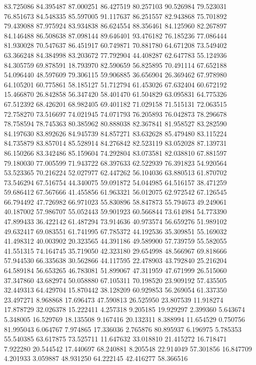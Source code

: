 83.725086
84.395487
87.000251
86.427519
80.257103
90.526984
79.523031
76.851673
84.548335
85.597005
91.117637
86.251557
82.943868
75.701892
79.439088
87.975924
83.934838
86.624554
88.356461
84.125960
82.267897
84.146488
86.508638
87.098144
89.646401
93.476182
76.185236
77.086444
81.930028
70.547637
86.451917
60.749871
70.881780
64.671208
73.549402
63.366248
84.384998
83.203672
77.792904
44.408287
62.647783
55.124936
84.305759
69.878591
18.793970
82.590659
56.825895
70.491114
67.652188
54.096440
48.597609
79.306115
59.906885
36.656904
26.369462
67.978980
64.105201
60.775861
58.185127
51.712794
61.453026
67.632404
60.672192
15.466870
26.842858
56.347420
58.401470
61.504829
63.095831
64.775326
67.512392
68.426201
68.982405
69.401182
71.029158
71.515131
72.063515
72.758270
73.516697
74.021945
74.071793
76.205893
76.042873
78.296678
78.758594
78.745363
80.385962
80.888038
82.367841
81.958527
83.282590
84.197630
83.892626
84.945739
84.857271
83.632628
85.479480
83.115224
84.735879
83.857014
85.528914
84.276842
82.523119
83.052028
87.139731
86.150266
83.342486
85.159604
74.292804
83.073581
82.038810
67.881597
79.180030
77.005599
71.943722
68.397633
62.522939
76.391823
54.920564
53.523365
70.216224
52.027977
62.447262
56.104036
63.880513
61.870702
73.546294
67.516754
44.340075
59.091872
54.044985
64.516157
38.471259
59.686412
67.567666
41.455856
61.963321
56.012075
62.972542
67.126545
66.794492
47.726982
66.971023
55.830896
58.847873
55.794673
49.249061
40.187002
57.986707
55.052443
59.901923
60.566844
73.614984
54.773390
47.899433
36.422142
61.487294
73.914636
40.973574
56.659276
51.989102
49.632417
69.083551
61.741995
67.785372
44.192536
35.309851
55.169032
41.498312
40.003902
20.323565
44.391186
49.589900
57.739759
55.582055
41.551315
74.164745
35.719050
42.323180
29.654998
48.566967
69.818666
57.944530
66.335638
30.562866
44.117595
22.478903
43.792840
25.216204
64.589184
56.653265
46.783081
51.899067
47.311959
47.671999
26.515060
37.347860
43.682974
50.058880
67.105311
70.198520
23.909192
57.435505
32.449313
64.429704
15.870442
38.128209
60.929853
56.269054
61.337350
23.497271
8.968868
17.696473
47.590813
26.525950
23.807539
11.918274
17.878729
32.026378
15.222411
4.257318
9.205185
19.929297
2.399360
5.643674
5.348005
16.529769
18.135508
9.167416
20.132311
8.388994
11.654529
0.750756
81.995043
6.064767
7.974865
17.336036
2.765876
80.895937
6.196975
5.785353
55.540385
63.617875
73.525711
11.647632
33.018810
21.415272
16.718471
7.922280
20.544542
17.440697
68.240881
8.205548
22.914049
57.301856
16.847709
4.201933
3.059887
48.931250
64.222145
42.416277
58.366516
